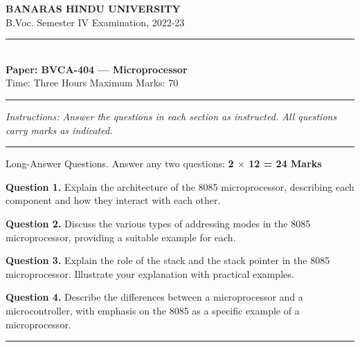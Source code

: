 \documentclass[11pt,a4paper]{article}
\begin{document}
\begin{center}
  {\large\bfseries BANARAS HINDU UNIVERSITY}\\[2pt]
  {
\normalsize B.Voc. Semester IV Examination, 2022-23}\\[6pt]
  \rule{0.8\linewidth}{0.5pt}\\[6pt]
  {\large\bfseries Paper: BVCA-404 --- Microprocessor}\\[4pt]
  {
\normalsize Time: Three Hours \hfill Maximum Marks: 70}
\end{center}

\rule{\linewidth}{0.4pt}

\smallskip



\noindent   \textit{Instructions: Answer the questions in each section as instructed. All questions carry marks as indicated.}

\bigskip




\rule{\linewidth}{0.4pt}\smallskip

Long-Answer Questions. Answer any two questions: \hfill   \textbf{2 $ \times$ 12 = 24 Marks}

\medskip



\noindent   \textbf{Question 1.} Explain the architecture of the 8085 microprocessor, describing each component and how they interact with each other.

\medskip



\noindent   \textbf{Question 2.} Discuss the various types of addressing modes in the 8085 microprocessor, providing a suitable example for each.

\medskip



\noindent   \textbf{Question 3.} Explain the role of the stack and the stack pointer in the 8085 microprocessor. Illustrate your explanation with practical examples.

\medskip



\noindent   \textbf{Question 4.} Describe the differences between a microprocessor and a microcontroller, with emphasis on the 8085 as a specific example of a microprocessor.

\bigskip


\rule{\linewidth}{0.4pt}\smallskip
\end{document}
